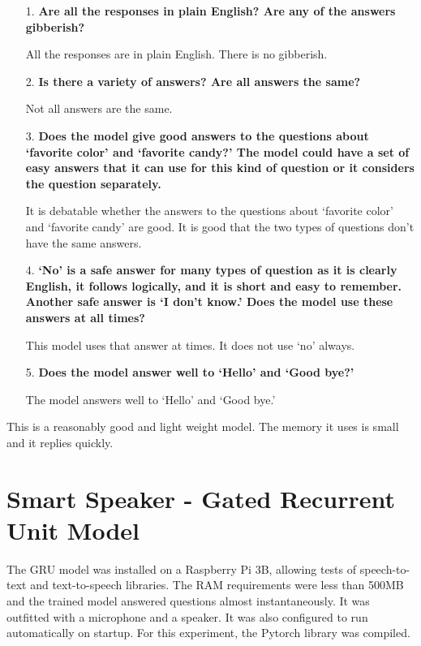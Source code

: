 \begin{itemize}
	\item [1.] \textbf{Are all the responses in plain English? Are any of the answers gibberish?}
	
	\item [] All the responses are in plain English. There is no gibberish.
	
	\item [2.] \textbf{Is there a  variety of answers? Are all answers the same?}
	
	\item [] Not all answers are the same.
	\item [3.] \textbf{Does the model give good answers to the questions about `favorite color' and `favorite candy?' The model could have a set of easy answers that it can use for this kind of question or it considers the question separately.} 
	
	\item[] It is debatable whether the answers to the questions about `favorite color' and `favorite candy' are good. It is good that the two types of questions don't have the same answers.
	
	\item [4.] \textbf{`No' is a safe answer for many types of question as it is clearly English, it follows logically, and it is short and easy to remember. Another safe answer is `I don't know.' Does the model use these answers at all times?}
	
	\item[] This model uses that answer at times. It does not use `no' always.
	
	\item [5.] \textbf{Does the model answer well to `Hello' and `Good bye?'}
	
	\item []The model answers well to `Hello' and `Good bye.'
\end{itemize}

This is a reasonably good and light weight model. The memory it uses is small and it replies quickly.

\section{Smart Speaker - Gated Recurrent Unit Model}

The GRU model was installed on a Raspberry Pi 3B, allowing tests of speech-to-text and text-to-speech libraries. The RAM requirements were less than 500MB and the trained model answered questions almost instantaneously. It was outfitted with a microphone and a speaker. It was also configured to run automatically on startup. For this experiment, the Pytorch library was compiled.

